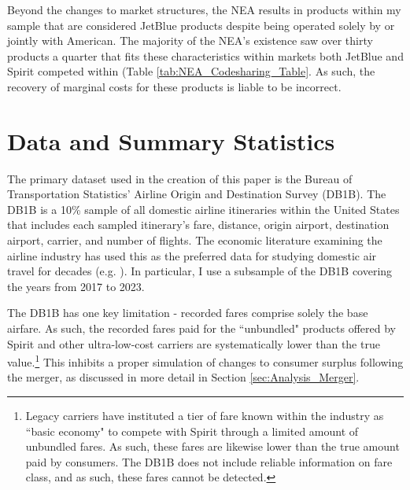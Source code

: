 \documentclass{article}
\begin{document}
    Beyond the changes to market structures, the NEA results in products within my sample that are considered JetBlue products despite being operated solely by or jointly with American. The majority of the NEA's existence saw over thirty products a quarter that fits these characteristics within markets both JetBlue and Spirit competed within (Table \ref{tab:NEA_Codesharing_Table}. As such, the recovery of marginal costs for these products is liable to be incorrect.  

	\section{Data and Summary Statistics}
	\label{sec:Data}
	The primary dataset used in the creation of this paper is the Bureau of Transportation Statistics' Airline Origin and Destination Survey (DB1B). The DB1B is a 10\% sample of all domestic airline itineraries within the United States that includes each sampled itinerary's fare, distance, origin airport, destination airport, carrier, and number of flights. The economic literature examining the airline industry has used this as the preferred data for studying domestic air travel for decades (e.g. \citet{ciliberto_market_2021, berry_tracing_2010, goolsbee_how_2008, peters_evaluating_2006}). In particular, I use a subsample of the DB1B covering the years from 2017 to 2023.  

    The DB1B has one key limitation - recorded fares comprise solely the base airfare. As such, the recorded fares paid for the ``unbundled" products offered by Spirit and other ultra-low-cost carriers are systematically lower than the true value.\footnote{Legacy carriers have instituted a tier of fare known within the industry as ``basic economy" to compete with Spirit through a limited amount of unbundled fares. As such, these fares are likewise lower than the true amount paid by consumers. The DB1B does not include reliable information on fare class, and as such, these fares cannot be detected.} This inhibits a proper simulation of changes to consumer surplus following the merger, as discussed in more detail in Section \ref{sec:Analysis_Merger}. 
    	
\end{document}
